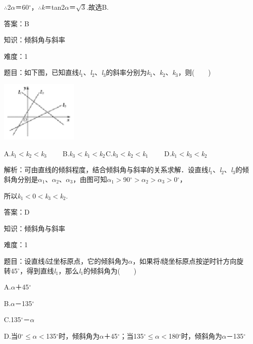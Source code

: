 \documentclass{article} %
\begin{document}
$\mathrm{\therefore}$2\textit{$\alpha$}＝60$\mathrm{{}^\circ}$，$\mathrm{\therefore}$\textit{k}＝tan2\textit{$\alpha$}＝$\sqrt{3}$.故选B.

答案：B

知识：倾斜角与斜率

难度：1

题目：如下图，已知直线\textit{l}${}_{1}$、\textit{l}${}_{2}$、\textit{l}${}_{3}$的斜率分别为\textit{k}${}_{1}$、\textit{k}${}_{2}$、\textit{k}${}_{3}$，则(　　)

\includegraphics*[width=1.50in, height=1.19in, keepaspectratio=false]{image265}

A.\textit{k}${}_{1}$$\mathrm{<}$\textit{k}${}_{2}$$\mathrm{<}$\textit{k}${}_{3}$　　 B.\textit{k}${}_{3}$$\mathrm{<}$\textit{k}${}_{1}$$\mathrm{<}$\textit{k}${}_{2}$${}_{ }$C.\textit{k}${}_{3}$$\mathrm{<}$\textit{k}${}_{2}$$\mathrm{<}$\textit{k}${}_{1}$　　 D.\textit{k}${}_{1}$$\mathrm{<}$\textit{k}${}_{3}$$\mathrm{<}$\textit{k}${}_{2}$

解析：可由直线的倾斜程度，结合倾斜角与斜率的关系求解．设直线\textit{l}${}_{1}$、\textit{l}${}_{2}$、\textit{l}${}_{3}$的倾斜角分别是\textit{$\alpha$}${}_{1}$、\textit{$\alpha$}${}_{2}$、\textit{$\alpha$}${}_{3}$，由图可知\textit{$\alpha$}${}_{1}$$\mathrm{>}$90$\mathrm{{}^\circ}$$\mathrm{>}$\textit{$\alpha$}${}_{2}$$\mathrm{>}$\textit{$\alpha$}${}_{3}$$\mathrm{>}$0$\mathrm{{}^\circ}$，

所以\textit{k}${}_{1}$$\mathrm{<}$0$\mathrm{<}$\textit{k}${}_{3}$$\mathrm{<}$\textit{k}${}_{2}$.

答案：D

知识：倾斜角与斜率

难度：1

题目：设直线\textit{l}过坐标原点，它的倾斜角为\textit{$\alpha$}，如果将\textit{l}绕坐标原点按逆时针方向旋转45$\mathrm{{}^\circ}$，得到直线\textit{l}${}_{1}$，那么\textit{l}${}_{1}$的倾斜角为(　　)

A.\textit{$\alpha$}＋45$\mathrm{{}^\circ}$

B.\textit{$\alpha$}－135$\mathrm{{}^\circ}$

C.135$\mathrm{{}^\circ}$－\textit{$\alpha$}

D.当0$\mathrm{{}^\circ}$$\mathrm{\le}$\textit{$\alpha$}$\mathrm{<}$135$\mathrm{{}^\circ}$时，倾斜角为\textit{$\alpha$}＋45$\mathrm{{}^\circ}$；当135$\mathrm{{}^\circ}$$\mathrm{\le}$\textit{$\alpha$}$\mathrm{<}$180$\mathrm{{}^\circ}$时，倾斜角为\textit{$\alpha$}－135$\mathrm{{}^\circ}$
\end{document}
